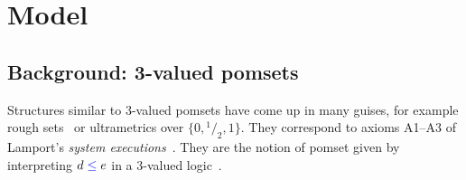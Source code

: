 \begin{comment}
https://preshing.com/20131125/acquire-and-release-fences-dont-work-the-way-youd-expect/

Cannot encode R/A actions with actions+fences...

A release operation prevents preceding memory operations from being delayed
past it (a;Rel =/=> Rel;a)
 
A release fence prevents preceding memory operations from being delayed past
subsequent writes (a;FR;w =/=> w;a;FR)

An acquire operation prevents subsequent memory operations from being advanced
before it (Acq;a =/=> a;Acq)

An acquire fence prevents subsequent memory operations from being advanced
before prior reads (r;FA;a =/=> FA;a;r)

https://www.modernescpp.com/index.php/fences-as-memory-barriers

StoreLoad: Full fence allows a store before to be reordered with respect to a
load after (wx;F;ry) ===> (ry;F;wx)

StoreLoad+LoadLoad: Release fence also allows (rx;FR;ry) ===> (ry;FR;rx)

StoreLoad+StoreStore: Acquire fence also allows (wx;FR;wy) ===> (wy;FR;wx)

LoadStore: No fence allows a prior load to reorder w.r.t. a subsequent store
(rx;FR;wy) =/=> (wy;FR;rx)

https://preshing.com/20120710/memory-barriers-are-like-source-control-operations/
Good news is that a fullFence does it.

Bizarrely, it seems this is not supported in C++... You have to go to assembly.
\end{comment}

\section{Model}
\label{sec:model}


\subsection{Background: 3-valued pomsets}
\label{sec:pomsets}

Structures similar to 3-valued pomsets have come up in many guises, for example
rough sets~\cite{Pawlak1982} or ultrametrics over
$\{0,{}^1\!/_2,1\}$. They correspond to axioms A1--A3 of Lamport's
\emph{system executions}~\cite{DBLP:journals/dc/Lamport86}.
They are the notion of pomset given by interpreting
$d\mathrel{{\color{blue}\leq}}e$ in a 3-valued logic~\cite{Urquhart1986}. 


